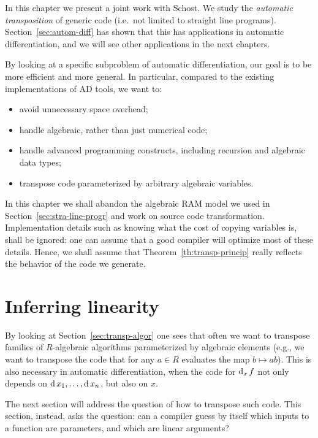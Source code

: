 In this chapter we present a joint work with Schost. We study the
\emph{automatic transposition} of
generic code (i.e.\ not limited to straight line
programs). Section~\ref{sec:autom-diff} has shown that this has
applications in automatic differentiation, and we will see other
applications in the next chapters.

By looking at a specific subproblem of automatic differentiation, our
goal is to be more efficient and more general. In particular, compared
to the existing implementations of AD tools, we want to:
\begin{itemize}
\item avoid unnecessary space overhead;
\item handle algebraic, rather than just numerical code;
\item handle advanced programming constructs, including recursion and
  algebraic data types;
\item transpose code parameterized by arbitrary algebraic variables.
\end{itemize}

In this chapter we shall abandon the algebraic RAM model we used in
Section~\ref{sec:stra-line-progr} and work on source code
transformation. Implementation details such as knowing what the cost
of copying variables is, shall be ignored: one can assume that a good
compiler will optimize most of these details. Hence, we shall assume
that Theorem~\ref{th:transp-princip} really reflects the behavior of
the code we generate.


\section{Inferring linearity}
\label{sec:inference}
\lstset{language=haskell}

By looking at Section~\ref{sec:transp-algor} one sees that often we
want to transpose families of $R$-algebraic algorithms parameterized
by algebraic elements (e.g., we want to transpose the code that for
any $a\in R$ evaluates the map $b\mapsto ab$). This is also necessary
in automatic differentiation, when the code for $\operatorname{d}_x f$ not only
depends on $\operatorname{d} x_1,\ldots,\operatorname{d} x_n$, but also on $x$.

The next section will address the question of how to transpose such
code. This section, instead, asks the question: can a compiler guess
by itself which inputs to a function are parameters, and which are
linear arguments?

